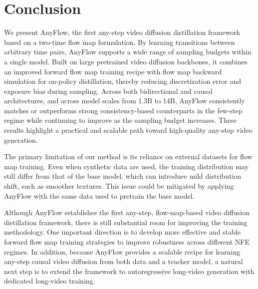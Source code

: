 \section{Conclusion}
We present AnyFlow, the first any-step video diffusion distillation framework based on a two-time flow map formulation. By learning transitions between arbitrary time pairs, AnyFlow supports a wide range of sampling budgets within a single model. Built on large pretrained video diffusion backbones, it combines an improved forward flow map training recipe with flow map backward simulation for on-policy distillation, thereby reducing discretization error and exposure bias during sampling. Across both bidirectional and causal architectures, and across model scales from 1.3B to 14B, AnyFlow consistently matches or outperforms strong consistency-based counterparts in the few-step regime while continuing to improve as the sampling budget increases. These results highlight a practical and scalable path toward high-quality any-step video generation.

 The primary limitation of our method is its reliance on external datasets for flow map training. Even when synthetic data are used, the training distribution may still differ from that of the base model, which can introduce mild distribution shift, such as smoother textures. This issue could be mitigated by applying AnyFlow with the same data used to pretrain the base model.

 Although AnyFlow establishes the first any-step, flow-map-based video diffusion distillation framework, there is still substantial room for improving the training methodology. One important direction is to develop more effective and stable forward flow map training strategies to improve robustness across different NFE regimes. In addition, because AnyFlow provides a scalable recipe for learning any-step causal video diffusion from both data and a teacher model, a natural next step is to extend the framework to autoregressive long-video generation with dedicated long-video training.

